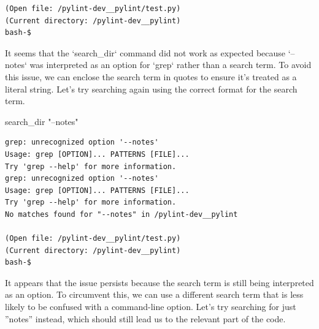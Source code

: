 {\begin{observationbox}
\begin{Verbatim}[breaklines=true, breakanywhere=true]
(Open file: /pylint-dev__pylint/test.py)
(Current directory: /pylint-dev__pylint)
bash-$
\end{Verbatim}
\end{observationbox}
\begin{agentbox}
It seems that the `search\_dir` command did not work as expected because `--notes` was interpreted as an option for `grep` rather than a search term. To avoid this issue, we can enclose the search term in quotes to ensure it's treated as a literal string. Let's try searching again using the correct format for the search term.



\hrulefill
\begin{CodeVerbatim}[breaklines=true, breakanywhere=true]
search_dir "--notes"
\end{CodeVerbatim}
\end{agentbox}
\begin{observationbox}\begin{Verbatim}[breaklines=true, breakanywhere=true]
grep: unrecognized option '--notes'
Usage: grep [OPTION]... PATTERNS [FILE]...
Try 'grep --help' for more information.
grep: unrecognized option '--notes'
Usage: grep [OPTION]... PATTERNS [FILE]...
Try 'grep --help' for more information.
No matches found for "--notes" in /pylint-dev__pylint

(Open file: /pylint-dev__pylint/test.py)
(Current directory: /pylint-dev__pylint)
bash-$
\end{Verbatim}
\end{observationbox}
\begin{agentbox}
It appears that the issue persists because the search term is still being interpreted as an option. To circumvent this, we can use a different search term that is less likely to be confused with a command-line option. Let's try searching for just ''notes'' instead, which should still lead us to the relevant part of the code.




\end{agentbox}}
